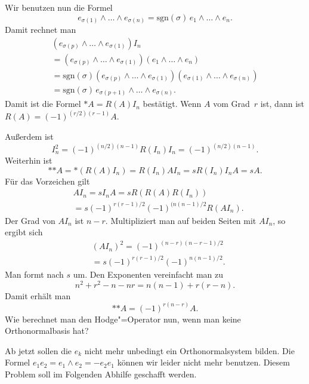 \documentclass[a4paper,11pt,fleqn,twocolumn,twoside]{scrartcl}
\numberwithin{equation}{section}
\begin{document}
Wir benutzen nun die Formel
\begin{equation}
e_{\sigma(1)}\wedge\ldots\wedge e_{\sigma(n)}
= \mathrm{sgn}(\sigma)\, e_1\wedge\ldots\wedge e_n.
\end{equation}
Damit rechnet man
\begin{gather*}
(e_{\sigma(p)}\wedge\ldots\wedge e_{\sigma(1)})I_n\\
= (e_{\sigma(p)}\wedge\ldots\wedge e_{\sigma(1)})
(e_1\wedge\ldots\wedge e_n)\\
= \mathrm{sgn}(\sigma)(e_{\sigma(p)}\wedge\ldots\wedge e_{\sigma(1)})
(e_{\sigma(1)}\wedge\ldots\wedge e_{\sigma(n)})\\
= \mathrm{sgn}(\sigma)\, e_{\sigma(p+1)}\wedge\ldots\wedge e_{\sigma(n)}.
\end{gather*}
Damit ist die Formel $*A=R(A)I_n$ bestätigt.
Wenn $A$ vom Grad~$r$ ist, dann ist
$R(A) = (-1)^{(r/2)(r-1)}A$.

Außerdem ist
\[I_n^2 = (-1)^{(n/2)(n-1)} R(I_n)I_n = (-1)^{(n/2)(n-1)}.\]
Weiterhin ist
\[*{*A} = *(R(A)I_n) = R(I_n)AI_n = sR(I_n)I_nA = sA.\]
Für das Vorzeichen gilt
\begin{equation}
\begin{split}
& AI_n = sI_nA = sR(R(A)R(I_n))\\
&= s(-1)^{r(r-1)/2}(-1)^{(n(n-1)/2} R(AI_n).
\end{split}
\end{equation}
Der Grad von $AI_n$ ist $n-r$.
Multipliziert man auf beiden Seiten mit $AI_n$, so ergibt sich
\begin{equation}
\begin{split}
& (AI_n)^2 = (-1)^{(n-r)(n-r-1)/2}\\
&= s(-1)^{r(r-1)/2}(-1)^{n(n-1)/2}.
\end{split}
\end{equation}
Man formt nach $s$ um. Den Exponenten vereinfacht man zu
\begin{equation}
n^2+r^2-n-nr = n(n-1) + r(r-n).
\end{equation}
Damit erhält man
\begin{equation}
*{*A} = (-1)^{r(n-r)}A.
\end{equation}
Wie berechnet man den Hodge"=Operator nun, wenn man keine
Orthonormalbasis hat?

Ab jetzt sollen die $e_k$ nicht mehr unbedingt ein Orthonormalsystem
bilden. Die Formel $e_1e_2=e_1\wedge e_2=-e_2e_1$ können wir leider
nicht mehr benutzen. Diesem Problem soll im Folgenden Abhilfe
geschafft werden.
\end{document}
